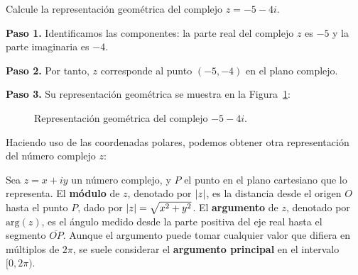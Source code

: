 \begin{example} Calcule la representación geométrica del complejo $z=-5-4i.$ \label{formageometrica54i}
\begin{myproof}
\textbf{Paso 1.} Identificamos las componentes: la parte real del complejo $z$ es $-5$ y la parte imaginaria es $-4$.

\textbf{Paso 2.} Por tanto, $z$ corresponde al punto $\boxed{(-5,-4)}$ en el plano complejo.

\textbf{Paso 3.} Su representación geométrica se muestra en la Figura~\ref{fig:complejo_54i}:

\begin{figure}[H]
\centering
{}
\caption{Representación geométrica del complejo $-5-4i.$}
\label{fig:complejo_54i}
\end{figure}
\end{myproof}
\end{example}

Haciendo uso de las coordenadas polares, podemos obtener otra representación del número complejo $z$:

\begin{definition}\label{modnumcom}
Sea $z=x+iy$ un número complejo, y $P$ el punto en el plano cartesiano que lo representa. El \textbf{módulo} de $z$, denotado por $\left\vert z\right\vert$, es la distancia desde el origen $O$ hasta el punto $P$, dado por $\left\vert z\right\vert=\sqrt{x^2+y^2}$. El \textbf{argumento} de $z$, denotado por $\text{arg}(z)$, es el ángulo medido desde la parte positiva del eje real hasta el segmento $\overline{OP}$. Aunque el argumento puede tomar cualquier valor que difiera en múltiplos de $2\pi$, se suele considerar el \textbf{argumento principal} en el intervalo $[0,2\pi)$.
\end{definition}

